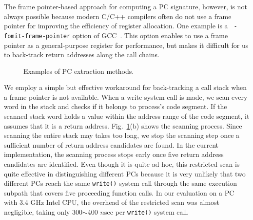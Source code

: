 The frame pointer-based approach for computing a PC signature, however, is not
always possible because modern C/C++ compilers often do not use a frame pointer
for improving the efficiency of register allocation.  One example is a {\tt
-fomit-frame-pointer} option of GCC~\cite{GCC}.  This option enables to use a frame
pointer as a general-purpose register for performance, but makes it difficult for us
to back-track return addresses along the call chains.  

\begin{figure}[t]
	\centering
	\caption{Examples of PC extraction methods.}
	\label{fig:getpc}
\end{figure}

We employ a simple but effective workaround for back-tracking a call stack when
a frame pointer is not available.  When a write system call is made,
we scan every word in the stack
and checks if it belongs to process's code segment.  If the scanned stack word
holds a value within the address range of the code segment, it assumes that it
is a return address.  
Fig.~\ref{fig:getpc}(b) shows the scanning process.
Since scanning the entire stack may takes too long, we stop
the scanning step once a sufficient number of return address candidates are found.
In the current implementation, the scanning process stops early once 
five return address candidates are identified.  
Even though it is quite ad-hoc, this restricted scan is quite effective
in distinguishing different PCs because it is very unlikely that two different PCs
reach the same \texttt{write()} system call through the same execution subpath 
that covers five proceeding function calls. 
In our evaluation on a PC with 3.4 GHz Intel CPU, the overhead of the
restricted scan was almost negligible, taking only 300$\sim$400 $n$sec per
\texttt{write()} system call.

